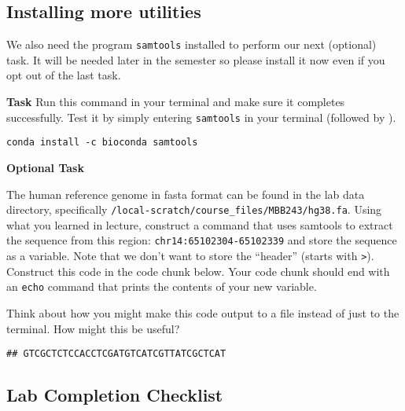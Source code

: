 \documentclass[
]{article}
\newenvironment{Shaded}{\begin{snugshade}}{\end{snugshade}}
\newcommand{\AttributeTok}[1]{\textcolor[rgb]{0.77,0.63,0.00}{#1}}
\newcommand{\BuiltInTok}[1]{#1}
\newcommand{\DataTypeTok}[1]{\textcolor[rgb]{0.13,0.29,0.53}{#1}}
\newcommand{\ExtensionTok}[1]{#1}
\newcommand{\FunctionTok}[1]{\textcolor[rgb]{0.00,0.00,0.00}{#1}}
\newcommand{\KeywordTok}[1]{\textcolor[rgb]{0.13,0.29,0.53}{\textbf{#1}}}
\newcommand{\NormalTok}[1]{#1}
\newcommand{\OperatorTok}[1]{\textcolor[rgb]{0.81,0.36,0.00}{\textbf{#1}}}
\newcommand{\VariableTok}[1]{\textcolor[rgb]{0.00,0.00,0.00}{#1}}
\begin{document}
\hypertarget{installing-more-utilities}{%
\subsection{Installing more utilities}\label{installing-more-utilities}}

We also need the program \texttt{samtools} installed to perform our next
(optional) task. It will be needed later in the semester so please
install it now even if you opt out of the last task.

\textbf{Task} Run this command in your terminal and make sure it
completes successfully. Test it by simply entering \texttt{samtools} in
your terminal (followed by ).

\begin{verbatim}
conda install -c bioconda samtools
\end{verbatim}

\textbf{Optional Task}

The human reference genome in fasta format can be found in the lab data
directory, specifically
\texttt{/local-scratch/course\_files/MBB243/hg38.fa}. Using what you
learned in lecture, construct a command that uses samtools to extract
the sequence from this region: \texttt{chr14:65102304-65102339} and
store the sequence as a variable. Note that we don't want to store the
``header'' (starts with \texttt{\textgreater{}}). Construct this code in
the code chunk below. Your code chunk should end with an \texttt{echo}
command that prints the contents of your new variable.

Think about how you might make this code output to a file instead of
just to the terminal. How might this be useful?

\begin{Shaded}
\end{Shaded}

\begin{verbatim}
## GTCGCTCTCCACCTCGATGTCATCGTTATCGCTCAT
\end{verbatim}

\hypertarget{lab-completion-checklist}{%
\subsection{Lab Completion Checklist}\label{lab-completion-checklist}}
\end{document}
